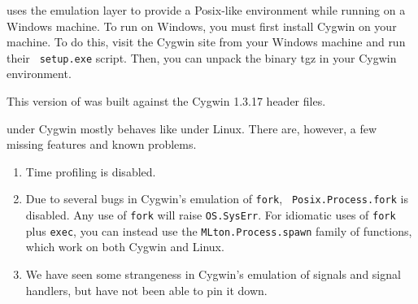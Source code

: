 
{\mlton} uses the  emulation
layer to provide a Posix-like environment while running on a Windows machine.
To run {\mlton} on Windows, you must first install Cygwin on your machine.  To
do this, visit the Cygwin site from your Windows machine and run their {\tt
setup.exe} script.  Then, you can unpack the {\mlton} binary tgz in your Cygwin
environment.

This version of {\mlton} was built against the Cygwin 1.3.17 header
files.

{\mlton} under Cygwin mostly behaves like {\mlton} under Linux.  There are,
however, a few missing features and known problems.

\begin{enumerate}

\item Time profiling is disabled.

\item Due to several bugs in Cygwin's emulation of {\tt fork}, {\tt
Posix.Process.fork} is disabled.  Any use of {\tt fork} will raise
{\tt OS.SysErr}.  For idiomatic uses of {\tt fork} plus {\tt exec},
you can instead use the {\tt MLton.Process.spawn} family of functions, which
work on both Cygwin and Linux.

\item We have seen some strangeness in Cygwin's emulation of signals and
signal handlers, but have not been able to pin it down.

\end{enumerate}


